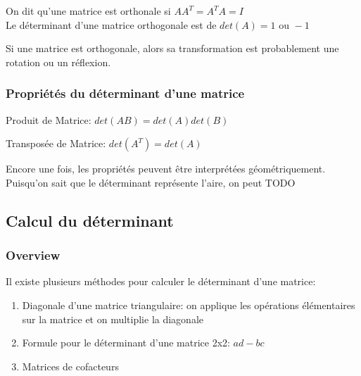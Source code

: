 \documentclass{article}
\begin{document}
\begin{definition}
    On dit qu'une matrice est orthonale si $ A A^T = A^T A = I$\\
    Le déterminant d'une matrice orthogonale est de $ det(A) = 1 \text{ ou } -1 $
\end{definition}

\begin{intuition}
    Si une matrice est orthogonale, alors sa transformation est probablement
    une rotation ou un réflexion.
\end{intuition}

\subsubsection{Propriétés du déterminant d'une matrice}%
\label{ssub:Propriétés du déterminant d'une matrice}

\begin{theorem}
\item Produit de Matrice: $ det(AB) = det(A) det(B) $
\item Transposée de Matrice: $ det(A^T) = det(A) $
\end{theorem}

\begin{remark}
    Encore une fois, les propriétés peuvent être interprétées géométriquement.
    Puisqu'on sait que le déterminant représente l'aire, on peut TODO
\end{remark}

\subsection{Calcul du déterminant}%
\label{sub:Calcul du déterminant}

\subsubsection{Overview}%
\label{ssub:Overview}

Il existe plusieurs méthodes pour calculer le déterminant d'une matrice:
\begin{enumerate}
    \item Diagonale d'une matrice triangulaire: on applique les opérations
	élémentaires sur la matrice et on multiplie la diagonale
    \item Formule pour le déterminant d'une matrice 2x2:
	$ ad-bc $
    \item Matrices de cofacteurs
\end{enumerate}
\end{document}
